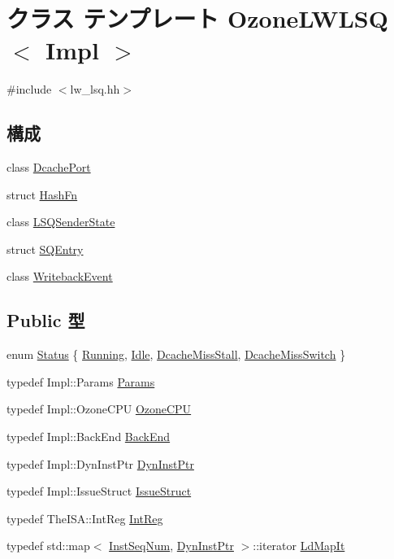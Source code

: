 \hypertarget{classOzoneLWLSQ}{
\section{クラス テンプレート OzoneLWLSQ$<$ Impl $>$}
\label{classOzoneLWLSQ}
}


{\ttfamily \#include $<$lw\_\-lsq.hh$>$}\subsection*{構成}
\begin{DoxyCompactItemize}
\item 
class \hyperlink{classOzoneLWLSQ_1_1DcachePort}{DcachePort}
\item 
struct \hyperlink{structOzoneLWLSQ_1_1HashFn}{HashFn}
\item 
class \hyperlink{classOzoneLWLSQ_1_1LSQSenderState}{LSQSenderState}
\item 
struct \hyperlink{structOzoneLWLSQ_1_1SQEntry}{SQEntry}
\item 
class \hyperlink{classOzoneLWLSQ_1_1WritebackEvent}{WritebackEvent}
\end{DoxyCompactItemize}
\subsection*{Public 型}
\begin{DoxyCompactItemize}
\item 
enum \hyperlink{classOzoneLWLSQ_a67a0db04d321a74b7e7fcfd3f1a3f70b}{Status} \{ \hyperlink{classOzoneLWLSQ_a67a0db04d321a74b7e7fcfd3f1a3f70ba2f5f2c4a8c4f4f0519d503dcdfbf55cb}{Running}, 
\hyperlink{classOzoneLWLSQ_a67a0db04d321a74b7e7fcfd3f1a3f70bad3fa9ae9431d6cb1772f9d9df48cab19}{Idle}, 
\hyperlink{classOzoneLWLSQ_a67a0db04d321a74b7e7fcfd3f1a3f70ba4ba5ae5815b190bd652669e2fdea5ed7}{DcacheMissStall}, 
\hyperlink{classOzoneLWLSQ_a67a0db04d321a74b7e7fcfd3f1a3f70bad01f64e5e67cc64e6ad4152f187a034d}{DcacheMissSwitch}
 \}
\item 
typedef Impl::Params \hyperlink{classOzoneLWLSQ_a818e103eae798a24a06a0a34631849ea}{Params}
\item 
typedef Impl::OzoneCPU \hyperlink{classOzoneLWLSQ_a9730cc41bccb218cae8f32869b8d887e}{OzoneCPU}
\item 
typedef Impl::BackEnd \hyperlink{classOzoneLWLSQ_a3de526baa0cbb2b55bf669a6f7bf81cc}{BackEnd}
\item 
typedef Impl::DynInstPtr \hyperlink{classOzoneLWLSQ_a028ce10889c5f6450239d9e9a7347976}{DynInstPtr}
\item 
typedef Impl::IssueStruct \hyperlink{classOzoneLWLSQ_a568c86f6403070f1cb743e994405ba8b}{IssueStruct}
\item 
typedef TheISA::IntReg \hyperlink{classOzoneLWLSQ_a1355cb78d031430d4d70eb5080267604}{IntReg}
\item 
typedef std::map$<$ \hyperlink{inst__seq_8hh_a258d93d98edaedee089435c19ea2ea2e}{InstSeqNum}, \hyperlink{classOzoneLWLSQ_a028ce10889c5f6450239d9e9a7347976}{DynInstPtr} $>$::iterator \hyperlink{classOzoneLWLSQ_a8b43ca5318a59872c61492868e50bab6}{LdMapIt}
\end{DoxyCompactItemize}
